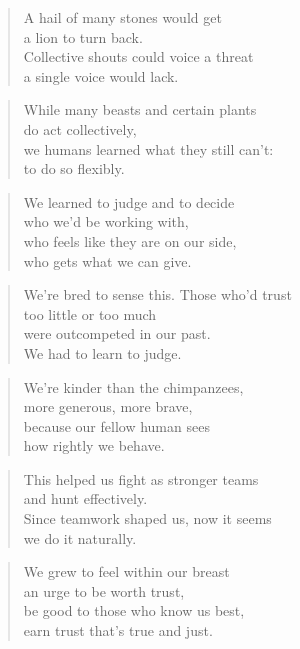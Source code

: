 \documentclass[10pt,a4paper]{article}
\begin{document}
\begin{multicols}{2}
\begin{verse}
A hail of many stones would get\\
a lion to turn back.\\
Collective shouts could voice a threat\\
a single voice would lack.
\end{verse}

\begin{verse}
While many beasts and certain plants\\
do act collectively,\\
we humans learned what they still can’t:\\
to do so flexibly.
\end{verse}

\begin{verse}
We learned to judge and to decide\\
who we’d be working with,\\
who feels like they are on our side,\\
who gets what we can give.
\end{verse}

\begin{verse}
We’re bred to sense this. Those who’d trust\\
too little or too much\\
were outcompeted in our past.\\
We had to learn to judge.
\end{verse}

\begin{verse}
We’re kinder than the chimpanzees,\\
more generous, more brave,\\
because our fellow human sees\\
how rightly we behave.
\end{verse}

\begin{verse}
This helped us fight as stronger teams\\
and hunt effectively.\\
Since teamwork shaped us, now it seems\\
we do it naturally.
\end{verse}

\begin{verse}
We grew to feel within our breast\\
an urge to be worth trust,\\
be good to those who know us best,\\
earn trust that’s true and just.
\end{verse}


\end{multicols}
\end{document}
